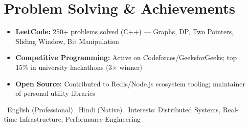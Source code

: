 \documentclass[10pt,a4paper]{article}
\begin{document}
\section{Problem Solving \& Achievements}
\begin{itemize}
    \item \textbf{LeetCode:} 250+ problems solved (C++) — Graphs, DP, Two Pointers, Sliding Window, Bit Manipulation
    \item \textbf{Competitive Programming:} Active on Codeforces/GeeksforGeeks; top 15\% in university hackathons (3$\times$ winner)
    \item \textbf{Open Source:} Contributed to Redis/Node.js ecosystem tooling; maintainer of personal utility libraries
\end{itemize}

\vfill
\begin{center}
    {\small \color{muted} \faLanguage\ English (Professional) \textbar\ Hindi (Native) \textbar\ Interests: Distributed Systems, Real-time Infrastructure, Performance Engineering}
\end{center}
\end{document}
